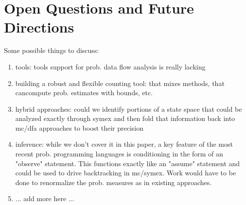 \section{Open Questions and Future Directions}
\label{sec:future}

Some possible things to discuss:
\begin{enumerate}
\item tools: tools support for prob. data flow analysis is really lacking
\item building a robust and flexible counting tool: that mixes methods, that cancompute prob. estimates with bounds, etc.
\item hybrid approaches: could we identify portions of a state
space that could be analyzed exactly through symex and then fold
that information back into mc/dfa approaches to boost their precision
\item inference: while we don't cover it in this paper, a key feature of
the most recent prob. programming languages is conditioning in the form
of an "observe" statement.  This functions exactly like an "assume" 
statement and could be used to drive backtracking in mc/symex.  Work
would have to be done to renormalize the prob. measures as in existing
approaches.
\item ... add more here ...
\end{enumerate}
